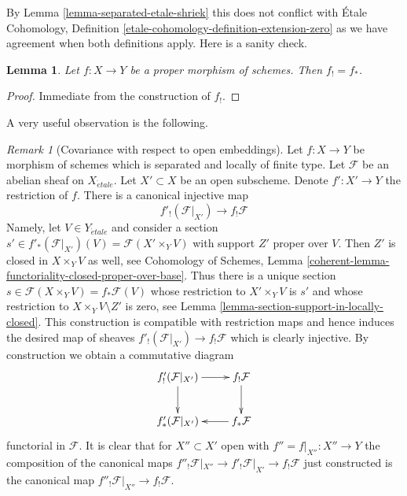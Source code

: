 \documentclass{stacks-project}
\theoremstyle{plain}
\newtheorem{lemma}[subsection]{Lemma}
\theoremstyle{definition}
\theoremstyle{remark}
\newtheorem{remark}[subsection]{Remark}
\numberwithin{equation}{subsection}
\def\etale{{\acute{e}tale}}
\begin{document}
\noindent
By Lemma \ref{lemma-separated-etale-shriek} this does not conflict with
\'Etale Cohomology, Definition \ref{etale-cohomology-definition-extension-zero}
as we have agreement when both definitions apply. Here is a sanity check.

\begin{lemma}
\label{lemma-proper-f-shriek}
Let $f : X \to Y$ be a proper morphism of schemes.
Then $f_! = f_*$.
\end{lemma}

\begin{proof}
Immediate from the construction of $f_!$.
\end{proof}

\noindent
A very useful observation is the following.

\begin{remark}[Covariance with respect to open embeddings]
\label{remark-covariance-f-shriek-separated}
Let $f : X \to Y$ be morphism of schemes which is separated and
locally of finite type. Let $\mathcal{F}$ be an abelian sheaf on $X_\etale$.
Let $X' \subset X$ be an open subscheme. Denote $f' : X' \to Y$
the restriction of $f$. There is a canonical injective map
$$
f'_!(\mathcal{F}|_{X'}) \longrightarrow f_!\mathcal{F}
$$
Namely, let $V \in Y_\etale$ and consider a section
$s' \in f'_*(\mathcal{F}|_{X'})(V) = \mathcal{F}(X' \times_Y V)$
with support $Z'$ proper over $V$. Then $Z'$ is closed in $X \times_Y V$
as well, see Cohomology of Schemes, Lemma
\ref{coherent-lemma-functoriality-closed-proper-over-base}.
Thus there is a unique section
$s \in \mathcal{F}(X \times_Y V) = f_*\mathcal{F}(V)$
whose restriction to $X' \times_Y V$ is $s'$ and whose restriction
to $X \times_Y V \setminus Z'$ is zero, see
Lemma \ref{lemma-section-support-in-locally-closed}. This construction is
compatible with restriction maps and hence induces the desired map of
sheaves $f'_!(\mathcal{F}|_{X'}) \to f_!\mathcal{F}$ which is clearly
injective. By construction we obtain a commutative diagram
$$
\xymatrix{
f'_!(\mathcal{F}|_{X'}) \ar[r] \ar[d] &
f_!\mathcal{F} \ar[d] \\
f'_*(\mathcal{F}|_{X'}) &
f_*\mathcal{F} \ar[l]
}
$$
functorial in $\mathcal{F}$. It is clear that for $X'' \subset X'$ open
with $f'' = f|_{X''} : X'' \to Y$ the composition of the canonical maps
$f''_!\mathcal{F}|_{X''} \to f'_!\mathcal{F}|_{X'} \to f_!\mathcal{F}$
just constructed is the canonical map
$f''_!\mathcal{F}|_{X''} \to f_!\mathcal{F}$.
\end{remark}
\end{document}
